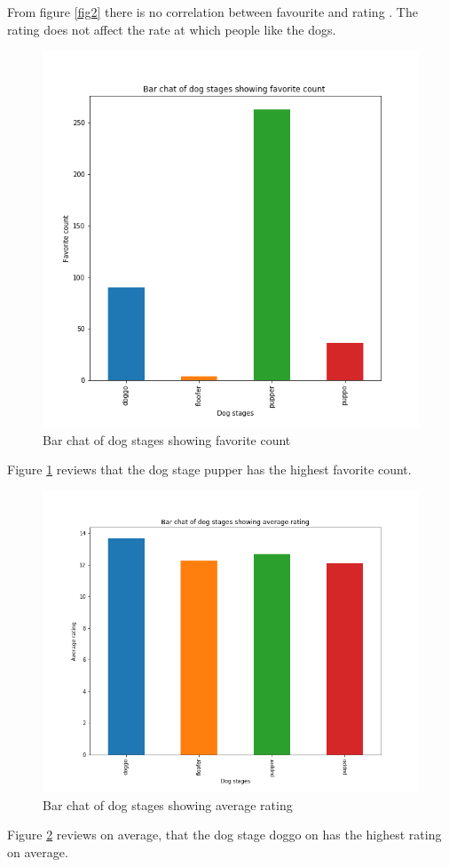 \documentclass[10pt,a4paper]{article}
\begin{document}
\noindent From figure  \ref{fig2} there is no correlation between favourite and rating . The rating does not affect the rate at which people like the dogs. 

\newpage

\begin{figure}[!h]
\includegraphics[scale=0.3]{Favorite_count.png} 
\caption{Bar chat of dog stages showing favorite count}
\label{fig3}
\end{figure}
Figure  \ref{fig3} reviews that the dog stage pupper has the highest favorite count. 


\begin{figure}[!h]
\includegraphics[scale=0.3]{Average_rating.png} 
\caption{Bar chat of dog stages showing average rating}
\label{fig4}
\end{figure}
Figure  \ref{fig4} reviews on average, that the dog stage doggo on  has the highest rating on average. 
\end{document}
